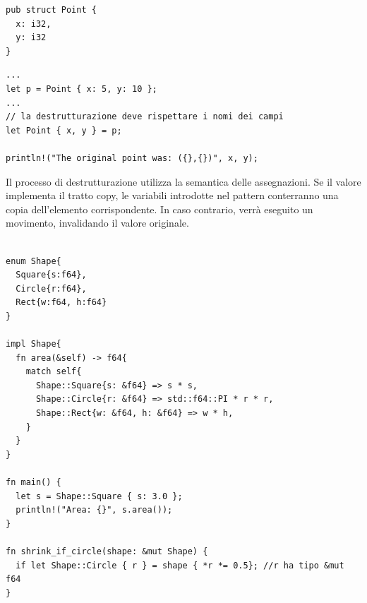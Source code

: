 

\begin{center}
  \centering
  \begin{minipage}{\linewidth}
    \begin{minipage}{0.35\linewidth}

      \begin{verbatim}
pub struct Point {
  x: i32,
  y: i32
}
\end{verbatim}

    \end{minipage}%
    \hfill
    \begin{minipage}{\linewidth}
      \begin{minipage}{0.6\linewidth}

        \begin{verbatim}
... 
let p = Point { x: 5, y: 10 };
...
// la destrutturazione deve rispettare i nomi dei campi
let Point { x, y } = p;

println!("The original point was: ({},{})", x, y);
\end{verbatim}
      \end{minipage}
    \end{minipage}
  \end{minipage}
\end{center}






Il processo di destrutturazione utilizza la semantica delle assegnazioni. Se il valore
implementa il tratto copy, le variabili introdotte nel pattern conterranno una copia
dell'elemento corrispondente. In caso contrario, verrà eseguito un movimento,
invalidando il valore originale.

\begin{verbatim}

enum Shape{
  Square{s:f64}, 
  Circle{r:f64}, 
  Rect{w:f64, h:f64}
}

impl Shape{
  fn area(&self) -> f64{
    match self{
      Shape::Square{s: &f64} => s * s,
      Shape::Circle{r: &f64} => std::f64::PI * r * r,
      Shape::Rect{w: &f64, h: &f64} => w * h,
    }
  }
}

fn main() {
  let s = Shape::Square { s: 3.0 };
  println!("Area: {}", s.area());
}

fn shrink_if_circle(shape: &mut Shape) {
  if let Shape::Circle { r } = shape { *r *= 0.5}; //r ha tipo &mut f64
}
  
\end{verbatim}







